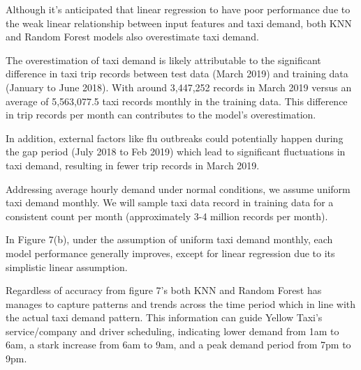 \documentclass[11pt]{article}
\begin{document}
Although it's anticipated that linear regression to have poor performance due to the weak linear relationship between input features and taxi demand, both KNN and Random Forest models also overestimate taxi demand. 

The overestimation of taxi demand is likely attributable to the significant difference in taxi trip records between test data (March 2019) and training data (January to June 2018). With around 3,447,252 records in March 2019 versus an average of 5,563,077.5 taxi records monthly in the training data. This difference in trip records per month can contributes to the model's overestimation.

In addition, external factors like flu outbreaks could potentially happen during the gap period (July 2018 to Feb 2019) which lead to significant fluctuations in taxi demand, resulting in fewer trip records in March 2019.


Addressing average hourly demand under normal conditions, we assume uniform taxi demand monthly. We will sample taxi data record in training data for a consistent count per month (approximately 3-4 million records per month). 

In Figure 7(b), under the assumption of uniform taxi demand monthly, each model performance generally improves, except for linear regression due to its simplistic linear assumption.

Regardless of accuracy from figure 7’s both KNN and Random Forest has manages to capture patterns and trends across the time period which in line with the actual taxi demand pattern. This information can guide Yellow Taxi's service/company and driver scheduling, indicating lower demand from 1am to 6am, a stark increase from 6am to 9am, and a peak demand period from 7pm to 9pm.
\end{document}
